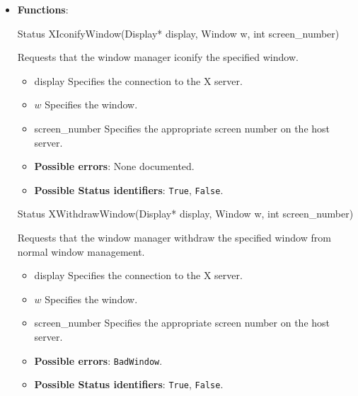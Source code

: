 \documentclass{report}
\begin{document}
\begin{itemize}
        \item \textbf{Functions}:
            \begin{cppcode}
                Status XIconifyWindow(Display* display, Window w, int screen_number)
            \end{cppcode}
            \bigbreak \noindent
            Requests that the window manager iconify the specified window.

            \begin{itemize}
                \item display Specifies the connection to the X server.
                \item $w$ Specifies the window.
                \item screen\_number Specifies the appropriate screen number on the host server.
            \end{itemize}

            \begin{itemize}
                \item \textbf{Possible errors}: None documented.
                \item \textbf{Possible Status identifiers}: \texttt{True}, \texttt{False}.
            \end{itemize}

            \begin{cppcode}
            Status XWithdrawWindow(Display* display, Window w, int screen_number)
            \end{cppcode}
            \bigbreak \noindent
            Requests that the window manager withdraw the specified window from normal window management.

            \begin{itemize}
                \item display Specifies the connection to the X server.
                \item $w$ Specifies the window.
                \item screen\_number Specifies the appropriate screen number on the host server.
            \end{itemize}

            \begin{itemize}
                \item \textbf{Possible errors}: \texttt{BadWindow}.
                \item \textbf{Possible Status identifiers}: \texttt{True}, \texttt{False}.
            \end{itemize}


\end{itemize}
\end{document}
